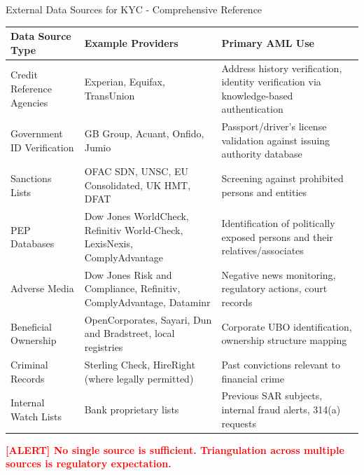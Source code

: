 \documentclass[11pt,a4paper]{beamer}
\newcommand{\redflag}[1]{\textcolor{red}{\textbf{[ALERT] #1}}}
\begin{document}
	\begin{frame}{External Data Sources for KYC - Comprehensive Reference}
		\begin{longtable}{p{}|p{}|p{}}
			\hline
			\rowcolor{lightgray}
			\textbf{Data Source Type} & \textbf{Example Providers} & \textbf{Primary AML Use} \\
			\hline
			Credit Reference Agencies & Experian, Equifax, TransUnion & Address history verification, identity verification via knowledge-based authentication \\
			\hline
			Government ID Verification & GB Group, Acuant, Onfido, Jumio & Passport/driver's license validation against issuing authority database \\
			\hline
			Sanctions Lists & OFAC SDN, UNSC, EU Consolidated, UK HMT, DFAT & Screening against prohibited persons and entities \\
			\hline
			PEP Databases & Dow Jones WorldCheck, Refinitiv World-Check, LexisNexis, ComplyAdvantage & Identification of politically exposed persons and their relatives/associates \\
			\hline
			Adverse Media & Dow Jones Risk and Compliance, Refinitiv, ComplyAdvantage, Dataminr & Negative news monitoring, regulatory actions, court records \\
			\hline
			Beneficial Ownership & OpenCorporates, Sayari, Dun and Bradstreet, local registries & Corporate UBO identification, ownership structure mapping \\
			\hline
			Criminal Records & Sterling Check, HireRight (where legally permitted) & Past convictions relevant to financial crime \\
			\hline
			Internal Watch Lists & Bank proprietary lists & Previous SAR subjects, internal fraud alerts, 314(a) requests \\
			\hline
		\end{longtable}
		
		\redflag{No single source is sufficient. Triangulation across multiple sources is regulatory expectation.}
	\end{frame}
	
\end{document}
